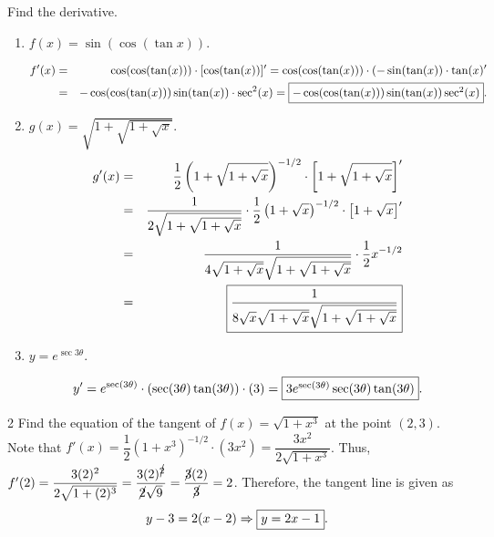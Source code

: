\documentclass{book}
\begin{document}
\begin{Exam} Find the derivative.
\begin{enumerate}
 \item $f(x) = \sin(\cos(\tan x))$. \vspace{-0.15 in}

\begin{eqnarray*}
f'(x) &=& \cos(\cos(\tan(x)))\cdot[\cos(\tan(x))]' = \cos(\cos(\tan(x)))\cdot(-\sin(\tan(x))\cdot \tan(x)'\\
& =& -\cos(\cos(\tan(x)))\sin(\tan(x))\cdot \sec^2(x) = \fbox{$-\cos(\cos(\tan(x)))\sin(\tan(x)) \sec^2(x)$}.
\end{eqnarray*}\vs

\item $g(x) = \sqrt{1+\sqrt{1+\sqrt{x}}}$.
\begin{eqnarray*}
g'(x) &=& \dfrac{1}{2}\left(1+\sqrt{1+\sqrt{x}}\right)^{-1/2}\cdot \left[1+\sqrt{1+\sqrt{x}}\right]'\\ &=& \dfrac{1}{2\sqrt{1+\sqrt{1+\sqrt{x}}}}\cdot \dfrac{1}{2}\left(1+\sqrt{x}\right)^{-1/2}\cdot \left[1+\sqrt{x}\right]'\\
&=& \dfrac{1}{4\sqrt{1+\sqrt{x}}\sqrt{1+\sqrt{1+\sqrt{x}}}}\cdot\dfrac{1}{2}x^{-1/2}\\ &=& \fbox{$\dfrac{1}{8\sqrt{x}\sqrt{1+\sqrt{x}}\sqrt{1+\sqrt{1+\sqrt{x}}}}$}
\end{eqnarray*}\vs 

\item $y = e^{\sec 3\theta}$. 

\[y' = e^{\sec(3\theta)}\cdot(\sec(3\theta)\tan(3\theta))\cdot(3) = \fbox{$3e^{\sec(3\theta)}\sec(3\theta)\tan(3\theta)$}. \] 
\end{enumerate}
\end{Exam}\vs

\begin{Exam} 
\begin{multicols}{2}
Find the equation of the tangent of $f(x) = \sqrt{1+x^3}$ at the point $(2,3)$.\\

Note that $f'(x) = \dfrac{1}{2}(1+x^3)^{-1/2}\cdot(3x^2) = \dfrac{ 3x^2}{2\sqrt{1+x^3}}$. Thus, $f'(2) = \dfrac{3(2)^2}{2\sqrt{1+(2)^3}}  = \dfrac{3(2)^{\cancel 2}}{\cancel{2}\sqrt{9}} = \dfrac{\cancel3(2)}{\cancel 3} = 2$. Therefore, the tangent line is given as \[y-3 = 2(x-2) \Rightarrow \fbox{$y = 2x-1$}. \]\vfill
\begin{center}
\end{center}
\end{multicols}
\end{Exam}\vs
\end{document}
